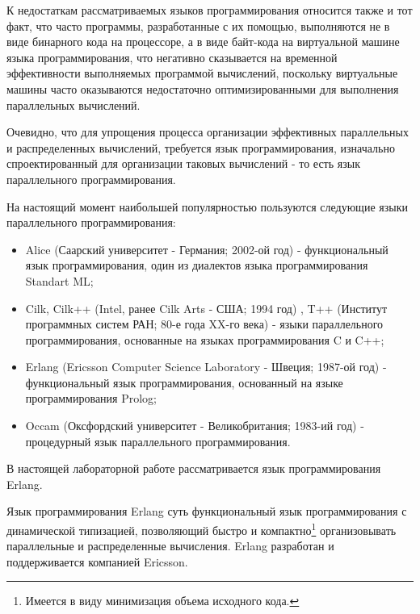 \begin{itemize}
	К недостаткам рассматриваемых языков программирования относится также и тот факт, что часто программы, разработанные с их помощью, выполняются не в виде бинарного кода на процессоре, а в виде байт-кода на виртуальной машине языка программирования, что негативно сказывается на временной эффективности выполняемых программой вычислений, поскольку виртуальные машины часто оказываются недостаточно оптимизированными для выполнения параллельных вычислений.

\end{itemize}

Очевидно, что для упрощения процесса организации эффективных параллельных и распределенных вычислений, требуется язык программирования, изначально спроектированный для организации таковых вычислений - то есть язык параллельного программирования.

На настоящий момент наибольшей популярностью пользуются следующие языки параллельного программирования:

\begin{itemize}

	\item Alice (Саарский университет - Германия; 2002-ой год) - функциональный язык программирования, один из диалектов языка программирования Standart ML;
	\item Cilk, Cilk++ (Intel, ранее Cilk Arts - США; 1994 год) , T++ (Институт программных систем РАН; 80-е года XX-го века) - языки параллельного программирования, основанные на языках программирования C и C++;
	\item Erlang (Ericsson Computer Science Laboratory - Швеция; 1987-ой год) - функциональный язык программирования, основанный на языке программирования Prolog;
	\item Occam (Оксфордский университет - Великобритания; 1983-ий год) - процедурный язык параллельного программирования.

\end{itemize}

В настоящей лабораторной работе рассматривается язык программирования Erlang.


Язык программирования Erlang \cite{erlang} суть функциональный язык программирования с динамической типизацией, позволяющий быстро и компактно\footnote{Имеется в виду минимизация объема исходного кода.} организовывать параллельные и распределенные вычисления. Erlang разработан и поддерживается компанией Ericsson.

